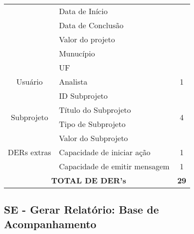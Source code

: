 \begin{table}[!h]
\begin{tabular}{|c|l|c|}
				& Data de Início                &                      \\ \cline{2-2}
				& Data de Conclusão             &                      \\ \cline{2-2}
				& Valor do projeto              &                      \\ \cline{2-2}
				& Munucípio                     &                      \\ \cline{2-2}
				& UF                            &                      \\ \hline
    Usuário                     & Analista                      & 1                    \\ \hline
    \multirow{4}{*}{Subprojeto} & ID Subprojeto                 & \multirow{4}{*}{4}   \\ \cline{2-2}
				& Título do Subprojeto          &                      \\ \cline{2-2}
				& Tipo de Subprojeto            &                      \\ \cline{2-2}
				& Valor do Subprojeto           &                      \\ \hline
    DERs extras                 & Capacidade de iniciar ação    & 1                    \\ \hline
    \multicolumn{1}{|l|}{}      & Capacidade de emitir mensagem & 1                    \\ \hline
    \multicolumn{2}{|c|}{\textbf{TOTAL DE DER's}}          & \textbf{29}         \\ \hline
    \end{tabular}
    \end{table}
  
  
  \pagebreak
  \vfill
  \subsection{SE - Gerar Relatório: Base de Acompanhamento}
   

